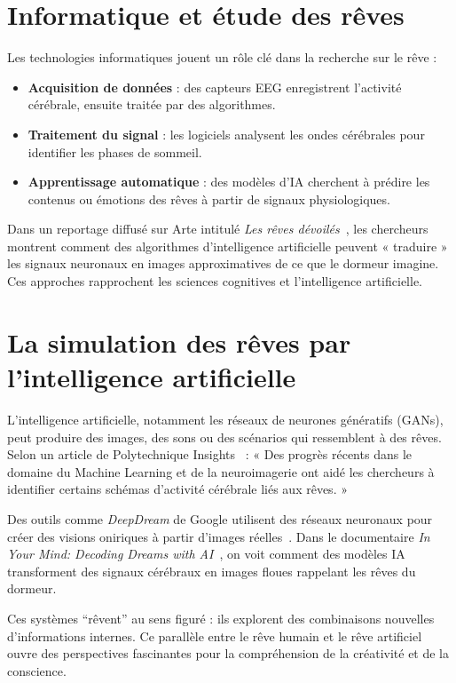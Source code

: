 \documentclass[12pt,a4paper]{article}
\begin{document}
\section{Informatique et étude des rêves}
Les technologies informatiques jouent un rôle clé dans la recherche sur le rêve :  
\begin{itemize}
    \item \textbf{Acquisition de données} : des capteurs EEG enregistrent l’activité cérébrale, ensuite traitée par des algorithmes.  
    \item \textbf{Traitement du signal} : les logiciels analysent les ondes cérébrales pour identifier les phases de sommeil.  
    \item \textbf{Apprentissage automatique} : des modèles d’IA cherchent à prédire les contenus ou émotions des rêves à partir de signaux physiologiques.  
\end{itemize}

Dans un reportage diffusé sur Arte intitulé \textit{Les rêves dévoilés}~\cite{arte}, les chercheurs montrent comment des algorithmes d’intelligence artificielle peuvent « traduire » les signaux neuronaux en images approximatives de ce que le dormeur imagine.  
Ces approches rapprochent les sciences cognitives et l’intelligence artificielle.

\section{La simulation des rêves par l’intelligence artificielle}
L’intelligence artificielle, notamment les réseaux de neurones génératifs (GANs), peut produire des images, des sons ou des scénarios qui ressemblent à des rêves.  
Selon un article de Polytechnique Insights~\cite{polytechnique} :  
« Des progrès récents dans le domaine du Machine Learning et de la neuroimagerie ont aidé les chercheurs à identifier certains schémas d’activité cérébrale liés aux rêves. »  

Des outils comme \textit{DeepDream} de Google utilisent des réseaux neuronaux pour créer des visions oniriques à partir d’images réelles~\cite{itsmf}.  
Dans le documentaire \textit{In Your Mind: Decoding Dreams with AI}~\cite{bbc}, on voit comment des modèles IA transforment des signaux cérébraux en images floues rappelant les rêves du dormeur.  

Ces systèmes “rêvent” au sens figuré : ils explorent des combinaisons nouvelles d’informations internes.  
Ce parallèle entre le rêve humain et le rêve artificiel ouvre des perspectives fascinantes pour la compréhension de la créativité et de la conscience.
\end{document}
